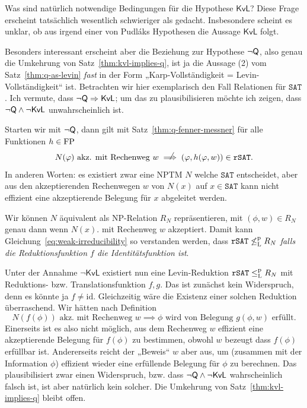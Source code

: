 Was sind natürlich notwendige Bedingungen für die Hypothese $\mathsf{KvL}$? Diese Frage erscheint tatsächlich wesentlich schwieriger als gedacht. Insbesondere scheint es unklar, ob aus irgend einer von Pudláks Hypothesen die Aussage $\mathsf{KvL}$ folgt.

Besonders interessant erscheint aber die Beziehung zur Hypothese $\neg\mathsf{Q}$, also genau die Umkehrung von Satz~\ref{thm:kvl-implies-q}, ist ja die Aussage (2) vom Satz~\ref{thm:q-as-levin} \emph{fast} in der Form „Karp-Vollständigkeit = Levin-Vollständigkeit“ ist.
Betrachten wir hier exemplarisch den Fall Relationen für $\mathtt{SAT}$. Ich vermute, dass $\neg\mathsf{Q}\Rightarrow \mathsf{KvL}$; um das zu plausibilisieren möchte ich zeigen, dass $\neg\mathsf{Q}\land\neg\mathsf{KvL}$ unwahrscheinlich ist.

Starten wir mit $\neg\mathsf{Q}$, dann gilt mit Satz~\ref{thm:q-fenner-messner} für alle Funktionen $h\in\mathrm{FP}$
\begin{equation} N(\phi) \text{ akz. mit Rechenweg $w$} \rlap{\hspace*{2pt}\raisebox{2.3pt}{$\quad\not$}}\implies  (\phi, h(\phi, w))\in\mathtt{rSAT}.\label{eq:weak-irreducibility} \end{equation}
In anderen Worten: es existiert zwar eine NPTM $N$ welche $\mathtt{SAT}$ entscheidet, aber aus den akzeptierenden Rechenwegen $w$ von $N(x)$ auf $x\in \mathtt{SAT}$ kann nicht effizient eine akzeptierende Belegung für $x$ abgeleitet werden.

Wir können $N$ äquivalent als NP-Relation $R_N$ repräsentieren, mit $(\phi, w) \in R_N$ genau dann wenn $N(x)$. mit Rechenweg $w$ akzeptiert.
Damit kann Gleichung~\ref{eq:weak-irreducibility} so verstanden werden, dass $\mathtt{rSAT} \not\leq_\mathrm{L}^\mathrm{p} R_N$ \emph{falls die Reduktionsfunktion $f$ die Identitätsfunktion ist}.

Unter der Annahme $\neg\mathsf{KvL}$ existiert nun eine Levin-Reduktion $\mathtt{rSAT}\leq_\mathrm{L}^\mathrm{p} R_N$ mit Reduktions- bzw. Translationsfunktion $f,g$. Das ist zunächst kein Widerspruch, denn es könnte ja $f\neq\mathrm{id}$.
%
%
Gleichzeitig wäre die Existenz einer solchen Reduktion überraschend. Wir hätten nach Definition
\begin{equation}\label{eq:effective-simulation} N(f(\phi)) \text{ akz. mit Rechenweg $w$} \implies \phi \text{ wird von Belegung $g(\phi, w)$ erfüllt}. \end{equation}
Einerseits ist es also nicht möglich, aus dem Rechenweg $w$ effizient eine akzeptierende Belegung für $f(\phi)$ zu bestimmen, obwohl $w$ bezeugt dass $f(\phi)$ erfüllbar ist.
Andererseits reicht der „Beweis“ $w$ aber aus, um (zusammen mit der Information $\phi$) effizient wieder eine erfüllende Belegung für $\phi$ zu berechnen. 
Das plausibilisiert zwar einen Widerspruch, bzw. dass $\neg\mathsf{Q}\land\neg\mathsf{KvL}$ wahrscheinlich falsch ist, ist aber natürlich kein solcher. Die Umkehrung von Satz~\ref{thm:kvl-implies-q} bleibt offen.

